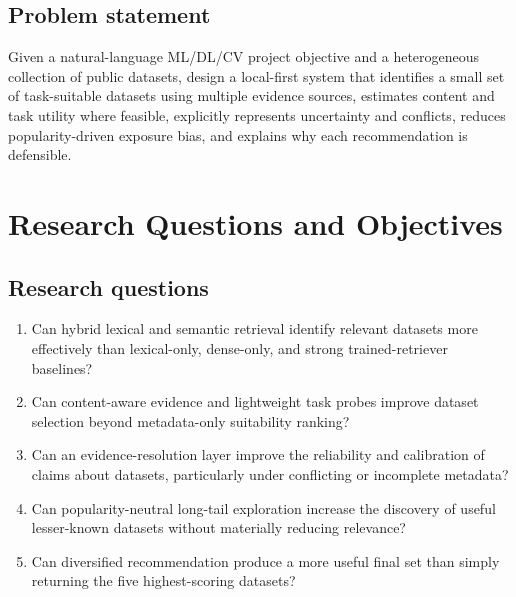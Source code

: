 \documentclass[11pt]{article}
\begin{document}
\subsection{Problem statement}
Given a natural-language ML/DL/CV project objective and a heterogeneous collection of public datasets,
design a local-first system that identifies a small set of task-suitable datasets using multiple evidence
sources, estimates content and task utility where feasible, explicitly represents uncertainty and
conflicts, reduces popularity-driven exposure bias, and explains why each recommendation is defensible.

\section{Research Questions and Objectives}

\subsection{Research questions}
\begin{enumerate}[leftmargin=*]
\item Can hybrid lexical and semantic retrieval identify relevant datasets more effectively than
      lexical-only, dense-only, and strong trained-retriever baselines?
\item Can content-aware evidence and lightweight task probes improve dataset selection beyond
      metadata-only suitability ranking?
\item Can an evidence-resolution layer improve the reliability and calibration of claims about datasets,
      particularly under conflicting or incomplete metadata?
\item Can popularity-neutral long-tail exploration increase the discovery of useful lesser-known datasets
      without materially reducing relevance?
\item Can diversified recommendation produce a more useful final set than simply returning the five
      highest-scoring datasets?
\end{enumerate}
\end{document}
